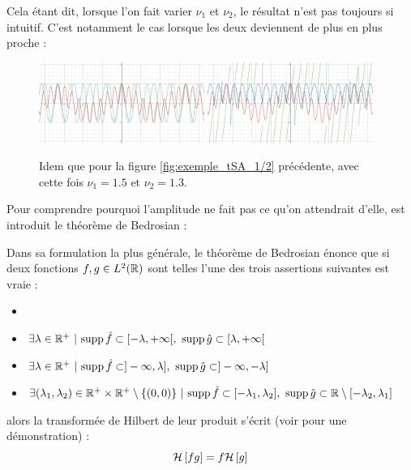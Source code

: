 Cela étant dit, lorsque l'on fait varier $\nu_1$ et $\nu_2$, le résultat n'est pas toujours si intuitif. C'est notamment le cas lorsque les deux deviennent de plus en plus proche :

\begin{figure}[h]\centering
	\includegraphics[width=0.48\textwidth]{fig/ex SA - 21.png}\hfill
	\includegraphics[width=0.48\textwidth]{fig/ex SA - 22.png}
	\caption{Idem que pour la figure \ref{fig:exemple_tSA_1/2} précédente, avec cette fois $\nu_1=1.5$ et $\nu_2=1.3$.}
	\label{fig:exemple_tSA_2/2}
\end{figure}

Pour comprendre pourquoi l'amplitude ne fait pas ce qu'on attendrait d'elle, est introduit le théorème de Bedrosian :

\begin{theoreme}[de Bedrosian]\label{theo:2Bedrosian}
	Dans sa formulation la plus générale, le théorème de Bedrosian énonce que si deux fonctions $f,g\in L^2(\mathbb{R})$ sont telles l'une des trois assertions suivantes est vraie :
	\begin{itemize}%
		\item 
		\item $\exists \lambda\in\mathbb{R}^+\ |\ \text{\normalfont supp}\, \hat{f} \subset [-\lambda, +\infty[,\ \text{\normalfont supp}\, \hat{g} \subset [\lambda, +\infty[$\label{item:1condi_theo2Bedrosian}
		
		\item $\exists \lambda\in\mathbb{R}^+\ |\ \text{\normalfont supp}\, \hat{f} \subset ]-\infty, \lambda],\ \text{\normalfont supp}\, \hat{g} \subset ]-\infty,-\lambda]$ \label{item:2condi_theo2Bedrosian}
		
		\item $\exists (\lambda_1,\lambda_2)\in \mathbb{R}^+\times\mathbb{R}^+ \setminus\{(0,0)\}\ |\ \text{\normalfont supp}\, \hat{f} \subset [-\lambda_1, \lambda_2],\ \text{\normalfont supp}\, \hat{g} \subset \mathbb{R}\setminus[-\lambda_2,\lambda_1]$
		
	\end{itemize}
	alors la transformée de Hilbert de leur produit s'écrit (voir \cite{wang_simple_2009} pour une démonstration) :
	\begin{equation}\label{eq:2Bedrosian}
		\mathcal{H}\left[fg\right] = f\mathcal{H}\left[g\right]
	\end{equation}
\end{theoreme}

